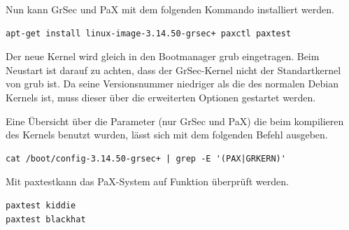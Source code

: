 \documentclass[parskip=full-]{scrartcl}
\begin{document}
Nun kann GrSec und PaX mit dem folgenden Kommando installiert werden.
\begin{lstlisting}
apt-get install linux-image-3.14.50-grsec+ paxctl paxtest
\end{lstlisting}

Der neue Kernel wird gleich in den Bootmanager grub eingetragen. Beim Neustart ist darauf zu achten, dass der GrSec-Kernel nicht der Standartkernel von grub ist. Da seine Versionsnummer niedriger als die des normalen Debian Kernels ist, muss dieser über die erweiterten Optionen gestartet werden.

Eine Übersicht über die Parameter (nur GrSec und PaX) die beim kompilieren des Kernels benutzt wurden, lässt sich mit dem folgenden Befehl ausgeben.
\begin{lstlisting}
cat /boot/config-3.14.50-grsec+ | grep -E '(PAX|GRKERN)'
\end{lstlisting}

Mit \glqq paxtest\grqq kann das PaX-System auf Funktion überprüft werden.
\begin{lstlisting}
paxtest kiddie
paxtest blackhat
\end{lstlisting}
\end{document}
